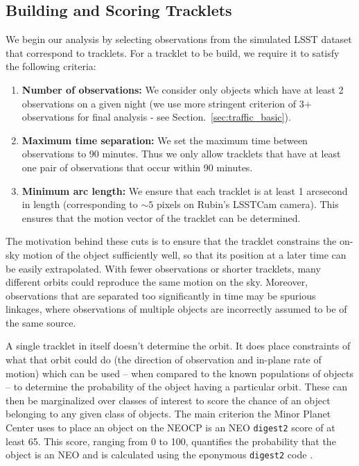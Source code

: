 \documentclass[twocolumn]{aastex631}
\newcommand{\dig}{\texttt{digest2}}
\begin{document}
\subsection{Building and Scoring Tracklets}\label{sec:digest2_score}
We begin our analysis by selecting observations from the simulated LSST dataset that correspond to tracklets. For a tracklet to be build, we require it to satisfy the following criteria:
\begin{enumerate}
    \item \textbf{Number of observations:} We consider only objects which have at least 2 observations on a given night (we use more stringent criterion of 3+ observations for final analysis - see Section.~\ref{sec:traffic_basic}).
    \item \textbf{Maximum time separation:} We set the maximum time between observations to 90 minutes. Thus we only allow tracklets that have at least one pair of observations that occur within 90 minutes.%
    \item \textbf{Minimum arc length:} We ensure that each tracklet is at least 1 arcsecond in length (corresponding to $\sim5$ pixels on Rubin's LSSTCam camera). This ensures that the motion vector of the tracklet can be determined.
\end{enumerate}
The motivation behind these cuts is to ensure that the tracklet constrains the on-sky motion of the object sufficiently well, so that its position at a later time can be easily extrapolated. With fewer observations or shorter tracklets, many different orbits could reproduce the same motion on the sky. Moreover, observations that are separated too significantly in time may be spurious linkages, where observations of multiple objects are incorrectly assumed to be of the same source.

A single tracklet in itself doesn't determine the orbit. It does place constraints of what that orbit could do (the direction of observation and in-plane rate of motion) which can be used -- when compared to the known populations of objects -- to determine the probability of the object having a particular orbit. These can then be marginalized over classes of interest to score the chance of an object belonging to any given class of objects. The main criterion the Minor Planet Center uses to place an object on the NEOCP is an NEO \dig{} score of at least 65. This score, ranging from 0 to 100, quantifies the probability that the object is an NEO and is calculated using the eponymous \dig{} code \citep{Keys+2019}.
\end{document}
